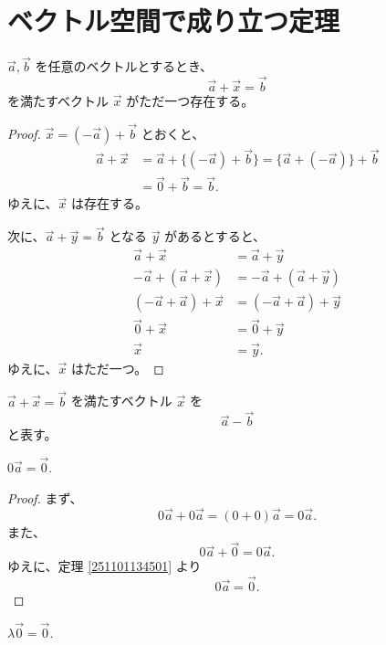 \chapter{ベクトル空間で成り立つ定理}

\begin{thm}\label{251101134501}
  \(\vec{a},\vec{b}\) を任意のベクトルとするとき、
  \[\vec{a}+\vec{x}=\vec{b}\]
  を満たすベクトル \(\vec{x}\) がただ一つ存在する。
\end{thm}

\begin{proof}
  \(\vec{x}=(-\vec{a})+\vec{b}\) とおくと、
  \begin{align*}
    \vec{a}+\vec{x} &= \vec{a}+\{(-\vec{a})+\vec{b}\}=\{\vec{a}+(-\vec{a})\}+\vec{b} \\
                    &= \vec{0}+\vec{b}=\vec{b}.
  \end{align*}
  ゆえに、\(\vec{x}\) は存在する。

  次に、\(\vec{a}+\vec{y}=\vec{b}\) となる \(\vec{y}\) があるとすると、
  \begin{align*}
               \vec{a}+\vec{x} &= \vec{a}+\vec{y} \\
    -\vec{a}+(\vec{a}+\vec{x}) &= -\vec{a}+(\vec{a}+\vec{y}) \\
    (-\vec{a}+\vec{a})+\vec{x} &= (-\vec{a}+\vec{a})+\vec{y} \\
               \vec{0}+\vec{x} &= \vec{0}+\vec{y} \\
                       \vec{x} &= \vec{y}.
  \end{align*}
  ゆえに、\(\vec{x}\) はただ一つ。
\end{proof}

\begin{dfn}
  \(\vec{a}+\vec{x}=\vec{b}\) を満たすベクトル \(\vec{x}\) を
  \[\vec{a}-\vec{b}\]
  と表す。
\end{dfn}

\begin{thm}\label{251101134702}
  \(0\vec{a}=\vec{0}.\)
\end{thm}

\begin{proof}
  まず、
  \[0\vec{a}+0\vec{a}=(0+0)\vec{a}=0\vec{a}.\]
  また、
  \[0\vec{a}+\vec{0}=0\vec{a}.\]
  ゆえに、定理 \ref{251101134501} より
  \[0\vec{a}=\vec{0}.\]
\end{proof}

\begin{thm}\label{251101134703}
  \(\lambda\vec{0}=\vec{0}.\)
\end{thm}

